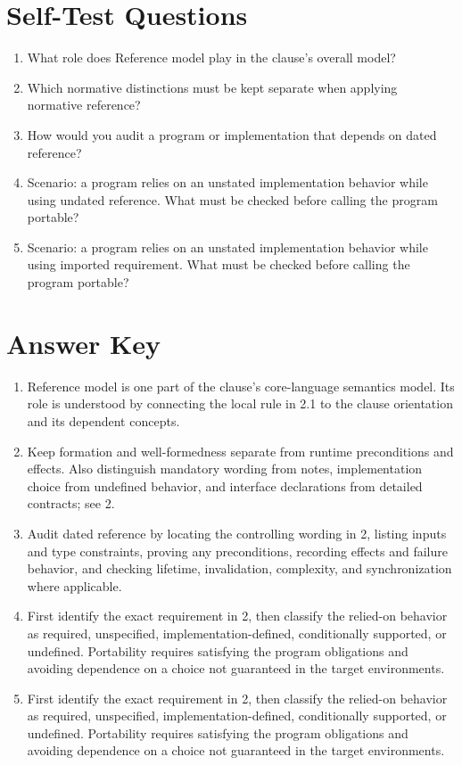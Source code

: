 \documentclass[11pt,letterpaper]{article}
\begin{document}
\section{Self-Test Questions}
\begin{enumerate}
\item What role does Reference model play in the clause's overall model?
\item Which normative distinctions must be kept separate when applying normative reference?
\item How would you audit a program or implementation that depends on dated reference?
\item Scenario: a program relies on an unstated implementation behavior while using undated reference. What must be checked before calling the program portable?
\item Scenario: a program relies on an unstated implementation behavior while using imported requirement. What must be checked before calling the program portable?
\end{enumerate}
\clearpage\section{Answer Key}
\begin{enumerate}
\item Reference model is one part of the clause's core-language semantics model. Its role is understood by connecting the local rule in 2.1 to the clause orientation and its dependent concepts.
\item Keep formation and well-formedness separate from runtime preconditions and effects. Also distinguish mandatory wording from notes, implementation choice from undefined behavior, and interface declarations from detailed contracts; see 2.
\item Audit dated reference by locating the controlling wording in 2, listing inputs and type constraints, proving any preconditions, recording effects and failure behavior, and checking lifetime, invalidation, complexity, and synchronization where applicable.
\item First identify the exact requirement in 2, then classify the relied-on behavior as required, unspecified, implementation-defined, conditionally supported, or undefined. Portability requires satisfying the program obligations and avoiding dependence on a choice not guaranteed in the target environments.
\item First identify the exact requirement in 2, then classify the relied-on behavior as required, unspecified, implementation-defined, conditionally supported, or undefined. Portability requires satisfying the program obligations and avoiding dependence on a choice not guaranteed in the target environments.
\end{enumerate}
\end{document}
